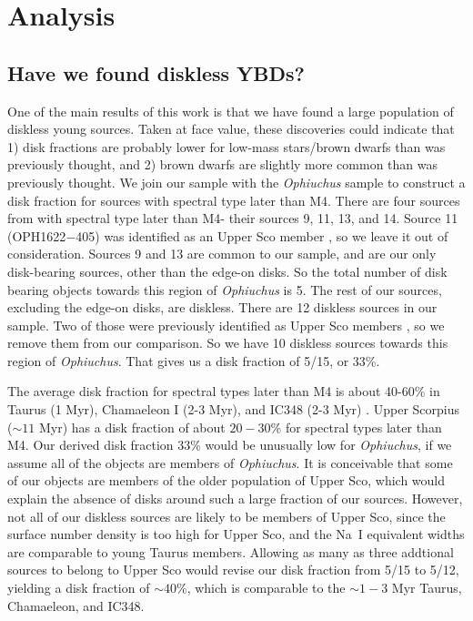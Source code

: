 \section{Analysis}
\subsection{Have we found diskless YBDs?}
One of the main results of this work is that we have found a large population of diskless young sources.  Taken at face value, these discoveries could indicate that 1) disk fractions are probably lower for low-mass stars/brown dwarfs than was previously thought, and 2) brown dwarfs are slightly more common than was previously thought.  We join our sample with the \citet{allers06} \emph{Ophiuchus} sample to construct a disk fraction for sources with spectral type later than M4.  There are four sources from \citet{allers06} with spectral type later than M4- their sources 9, 11, 13, and 14.  Source 11 (OPH1622$-$405) was identified as an Upper Sco member \citep{2007ApJ...659.1629L}, so we leave it out of consideration.  Sources 9 and 13 are common to our sample, and are our only disk-bearing sources, other than the edge-on disks.  So the total number of disk bearing objects towards this region of \emph{Ophiuchus} is 5.  The rest of our sources, excluding the edge-on disks, are diskless.  There are 12 diskless sources in our sample.  Two of those were previously identified as Upper Sco members \cite{2006AJ....131.3016S,2012ApJ...758...31L}, so we remove them from our comparison.  So we have 10 diskless sources towards this region of \emph{Ophiuchus}.  That gives us a disk fraction of 5/15, or 33\%.  

The average disk fraction for spectral types later than M4 is about 40-60\% in Taurus (1 Myr), Chamaeleon I (2-3 Myr), and IC348 (2-3 Myr) \citep{2012ARA&A..50...65L}.  Upper Scorpius ($\sim 11$ Myr) has a disk fraction of about $20-30$\% for spectral types later than M4.  Our derived disk fraction 33\% would be unusually low for \emph{Ophiuchus}, if we assume all of the objects are members of \emph{Ophiuchus}.  It is conceivable that some of our objects are members of the older population of Upper Sco, which would explain the absence of disks around such a large fraction of our sources.  However, not all of our diskless sources are likely to be members of Upper Sco, since the surface number density is too high for Upper Sco, and the Na~I equivalent widths are comparable to young Taurus members.  Allowing as many as three addtional sources to belong to Upper Sco would revise our disk fraction from 5/15 to 5/12, yielding a disk fraction of $\sim40$\%, which is comparable to the $\sim1-3$ Myr Taurus, Chamaeleon, and IC348.  

